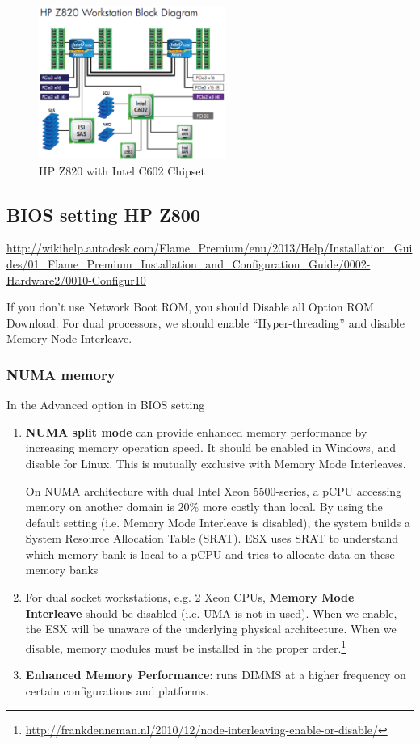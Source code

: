 \begin{figure}[hbt]
  \centerline{\includegraphics[height=5cm,
    angle=0]{./images/HPZ820.eps}}
\caption{HP Z820 with Intel C602 Chipset}
\label{fig:HPZ820}
\end{figure}



\subsection{BIOS setting HP Z800}
\label{sec:BIOS_Z800}

\url{http://wikihelp.autodesk.com/Flame_Premium/enu/2013/Help/Installation_Guides/01_Flame_Premium_Installation_and_Configuration_Guide/0002-Hardware2/0010-Configur10}

If you don't use Network Boot ROM, you should Disable all Option ROM Download.
For dual processors, we should enable ``Hyper-threading'' and disable Memory
Node Interleave. 

\subsubsection{NUMA memory}

In the Advanced option in BIOS setting
\begin{enumerate}
  \item {\bf NUMA split mode} can provide enhanced memory performance by
  increasing memory operation speed. It should be enabled in Windows, and
  disable for Linux. This is mutually exclusive with Memory Mode Interleaves. 
  
  On NUMA architecture with dual Intel Xeon 5500-series, a pCPU accessing memory
  on another domain is 20\% more costly than local. By using the default setting
  (i.e. Memory Mode Interleave is disabled), the system builds a System Resource
  Allocation Table (SRAT). ESX uses SRAT to understand which memory bank is
  local to a pCPU and tries to allocate data on these memory banks
  
  \item For dual socket workstations, e.g. 2 Xeon CPUs, {\bf Memory Mode
  Interleave} should be disabled (i.e. UMA is not in used). When we enable, the
  ESX will be unaware of the underlying physical architecture. When we disable,
  memory modules must be installed in the proper
  order.\footnote{\url{http://frankdenneman.nl/2010/12/node-interleaving-enable-or-disable/}}
  
  
  \item {\bf Enhanced Memory Performance}: runs DIMMS at a higher frequency on
  certain configurations and platforms.
\end{enumerate}


